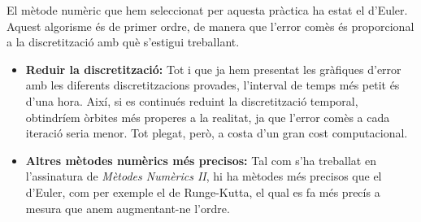 \documentclass[10pt, twoside, a4paper]{article}
\begin{document}
El mètode numèric que hem seleccionat per aquesta pràctica ha estat el d'Euler. Aquest algorisme és de primer ordre, de manera que l'error comès és proporcional a la discretització amb què s'estigui treballant.
\begin{itemize}
    \item \textbf{Reduir la discretització: } Tot i que ja hem presentat les gràfiques d'error amb les diferents discretitzacions provades, l'interval de temps més petit és d'una hora. Així, si es continués reduint la discretització temporal, obtindríem òrbites més properes a la realitat, ja que l'error comès a cada iteració seria menor. Tot plegat, però, a costa d'un gran cost computacional.
    \item \textbf{Altres mètodes numèrics més precisos: } Tal com s'ha treballat en l'assinatura de \textit{Mètodes Numèrics II}, hi ha mètodes més precisos que el d'Euler, com per exemple el de Runge-Kutta, el qual es fa més precís a mesura que anem augmentant-ne l'ordre.
\end{itemize}
\end{document}
